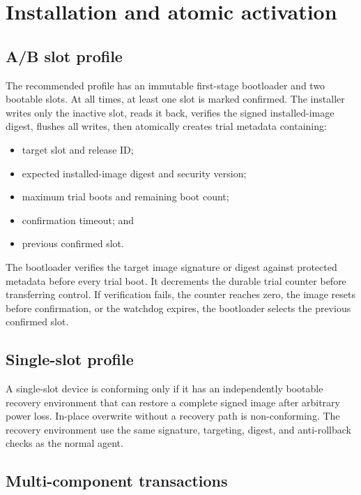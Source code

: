 \section{Installation and atomic activation}

\subsection{A/B slot profile}

The recommended profile has an immutable first-stage bootloader and two bootable
slots. At all times, at least one slot is marked confirmed. The installer writes
only the inactive slot, reads it back, verifies the signed installed-image digest,
flushes all writes, then atomically creates trial metadata containing:

\begin{itemize}
  \item target slot and release ID;
  \item expected installed-image digest and security version;
  \item maximum trial boots and remaining boot count;
  \item confirmation timeout; and
  \item previous confirmed slot.
\end{itemize}

The bootloader verifies the target image signature or digest against protected
metadata before every trial boot. It decrements the durable trial counter before
transferring control. If verification fails, the counter reaches zero, the image
resets before confirmation, or the watchdog expires, the bootloader selects the
previous confirmed slot.

\subsection{Single-slot profile}

A single-slot device is conforming only if it has an independently bootable
recovery environment that can restore a complete signed image after arbitrary
power loss. In-place overwrite without a recovery path is non-conforming. The
recovery environment \must use the same signature, targeting, digest, and
anti-rollback checks as the normal agent.

\subsection{Multi-component transactions}


